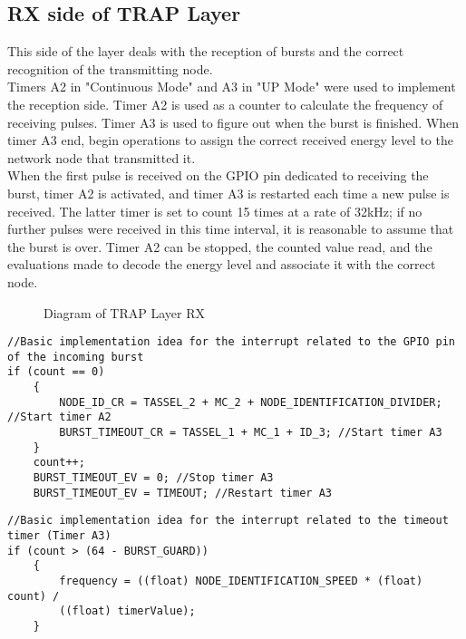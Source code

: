 \subsection{RX side of TRAP Layer}
This side of the layer deals with the reception of bursts and the correct recognition of the transmitting node.\\
Timers A2 in "Continuous Mode" and A3 in "UP Mode" were used to implement the reception side. Timer A2 is used as a counter to calculate the frequency of receiving pulses. Timer A3 is used to figure out when the burst is finished. When timer A3 end, begin operations to assign the correct received energy level to the network node that transmitted it.\\
When the first pulse is received on the GPIO pin dedicated to receiving the burst, timer A2 is activated, and timer A3 is restarted each time a new pulse is received. The latter timer is set to count 15 times at a rate of 32kHz; if no further pulses were received in this time interval, it is reasonable to assume that the burst is over. Timer A2 can be stopped, the counted value read, and the evaluations made to decode the energy level and associate it with the correct node.\\
  \begin{figure}[H]
    \centerline{}
    \caption{\footnotesize \centering Diagram of TRAP Layer RX}
    \label{fig:TRAPLayerRX}
  \end{figure}
\begin{lstlisting}
//Basic implementation idea for the interrupt related to the GPIO pin of the incoming burst
if (count == 0)
    {
        NODE_ID_CR = TASSEL_2 + MC_2 + NODE_IDENTIFICATION_DIVIDER; //Start timer A2
        BURST_TIMEOUT_CR = TASSEL_1 + MC_1 + ID_3; //Start timer A3
    }
    count++;
    BURST_TIMEOUT_EV = 0; //Stop timer A3
    BURST_TIMEOUT_EV = TIMEOUT; //Restart timer A3
\end{lstlisting}

\begin{lstlisting}
//Basic implementation idea for the interrupt related to the timeout timer (Timer A3)
if (count > (64 - BURST_GUARD))
    {
        frequency = ((float) NODE_IDENTIFICATION_SPEED * (float) count) / 
        ((float) timerValue);
    }
\end{lstlisting}

  
\newpage




